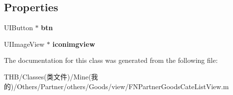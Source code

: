\subsection*{Properties}
\begin{DoxyCompactItemize}
\item 
\mbox{\label{interface_f_n_partner_goods_cate_list_cell_afd6684d6641a5663cc9aaf1213600d56}} 
U\+I\+Button $\ast$ {\bfseries btn}
\item 
\mbox{\label{interface_f_n_partner_goods_cate_list_cell_a41ade3d49bf28fc235b9b643fe91e209}} 
U\+I\+Image\+View $\ast$ {\bfseries iconimgview}
\end{DoxyCompactItemize}


The documentation for this class was generated from the following file\+:\begin{DoxyCompactItemize}
\item 
T\+H\+B/\+Classes(类文件)/\+Mine(我的)/\+Others/\+Partner/others/\+Goods/view/F\+N\+Partner\+Goods\+Cate\+List\+View.\+m\end{DoxyCompactItemize}
